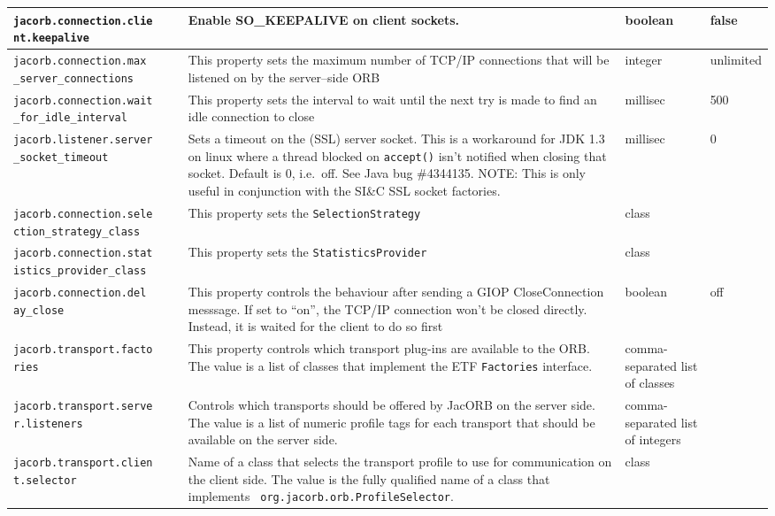{{\begin{small}
\begin{longtable}{|p{5cm}|p{7.5cm}|p{1.5cm}|p{1.5cm}|}
\hline
\verb"jacorb.connection.clie"
\verb"nt.keepalive" & Enable SO\_KEEPALIVE on client sockets. & boolean & false \\
\hline
\verb"jacorb.connection.max"
\verb"_server_connections" & This property sets the
  maximum number of TCP/IP connections that will be listened on by the
  server--side ORB & integer & unlimited \\
\hline
\verb"jacorb.connection.wait"
\verb"_for_idle_interval" & This property sets the
  interval to wait until the next try is made to find an idle connection to
  close & millisec & 500\\
\hline
\verb"jacorb.listener.server"
\verb"_socket_timeout" & Sets a timeout on the (SSL) server socket. This is a
workaround for JDK 1.3 on linux where a thread blocked on \verb"accept()"
isn't notified when closing that socket. Default is 0, i.e.~off. See Java bug
\#4344135. NOTE: This is only useful in conjunction with the SI\&C SSL socket
factories. & millisec & 0\\
\hline
\verb"jacorb.connection.sele"
\verb"ction_strategy_class" & This property sets
  the {\tt Selection\-Strategy} & class & \\
\hline
\verb"jacorb.connection.stat"
\verb"istics_provider_class" & This property sets
  the {\tt Statistics\-Provider} & class & \\
\hline
\verb"jacorb.connection.del"
\verb"ay_close" & This property controls the behaviour after sending a GIOP
CloseConnection messsage. If set to ``on'', the TCP/IP connection won't be
closed directly. Instead, it is waited for the client to do so
first & boolean & off \\
\hline
\hline
\verb"jacorb.transport.facto"
\verb"ries" & This property controls which transport plug-ins are
available to the ORB.  The value is a list of classes that implement the ETF
{\tt Factories} interface.
& comma-separated list of classes & \\
\hline
\verb"jacorb.transport.serve"
\verb"r.listeners" & Controls which transports should be offered by
JacORB on the server side.  The value is a list of numeric profile
tags for each transport that should be available on the server side.
& comma-separated list of integers & \\
\hline
\verb"jacorb.transport.clien"
\verb"t.selector" & Name of a class that selects the transport profile
to use for communication on the client side.  The value is the fully
qualified name of a class that implements {\tt
  org.jacorb.orb.ProfileSelector}.
& class & \\

\end{longtable}
\end{small}}}
